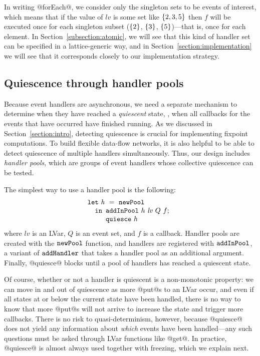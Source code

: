 In writing @forEach@, we consider only the singleton sets to be events
of interest, which means that if the value of $\mathit{lv}$ is some
set like $\left\{2, 3, 5\right\}$ then $f$ will be executed once for each
singleton subset ($\left\{2\right\}$, $\left\{3\right\}$, $\left\{5\right\}$)---that is,
once for each element.  In Section~\ref{subsection:atomic}, we will
see that this kind of handler set can be specified in a
lattice-generic way, and in Section~\ref{section:implementation} we
will see that it corresponds closely to our implementation strategy.

\subsection{Quiescence through handler pools}\label{subsection:quasi-quiescence}

Because event handlers are asynchronous, we need a separate mechanism
to determine when they have reached a \emph{quiescent} state, \ie,
when all callbacks for the events that have occurred have finished
running.  As we discussed in Section~\ref{section:intro}, detecting
quiescence is crucial for implementing fixpoint computations.  To
build flexible data-flow networks, it is also helpful to be able to
detect quiescence of multiple handlers simultaneously.  Thus, our
design includes \emph{handler pools}, which are groups of event
handlers whose collective quiescence can be tested.

The simplest way to use a handler pool is the following:
\[
\begin{array}[t]{l}
\termfont{let}~\mathit{h}~=~\NEWPOOL \\
\letspace \termfont{in}
  \begin{array}[t]{l}
    \ADDHANDLERINPOOL~h~\mathit{lv}~Q~f; \\
    \QUIESCE~h
  \end{array}
\end{array}
\]
where $\mathit{lv}$ is an LVar, $Q$ is an event set, and $f$ is a
callback.  Handler pools are created with the ${\mbox{\texttt{newPool}}}$ function, and
handlers are registered with ${\mbox{\texttt{addInPool}}}$, a variant of
${\mbox{\texttt{addHandler}}}$ that takes a handler pool as an additional argument.
Finally, @quiesce@ blocks until a pool of handlers has reached a
quiescent state.

Of course, whether or not a handler is quiescent is a non-monotonic
property: we can move in and out of quiescence as more @put@s to an
LVar occur, and even if all states at or below the current state have
been handled, there is no way to know that more @put@s will not arrive
to increase the state and trigger more callbacks.  There is no risk to
quasi-determinism, however, because @quiesce@ does not yield any
information about \emph{which} events have been handled---any such
questions must be asked through LVar functions like @get@.  In
practice, @quiesce@ is almost always used together with freezing,
which we explain next.

